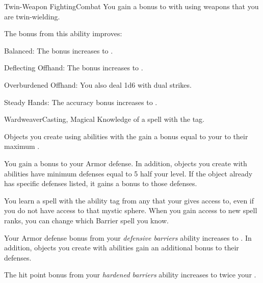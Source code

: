 \begin{feat}{Twin-Weapon Fighting}{Combat}
     You gain a  bonus to  with  using weapons that you are twin-wielding.

     The bonus from this ability improves:
    \begin{raggeditemize}
      \item Balanced: The bonus increases to .
      \item Deflecting Offhand: The bonus increases to .
      \item Overburdened Offhand: You also deal 1d6  with dual strikes.
      \item Steady Hands: The accuracy bonus increases to .
    \end{raggeditemize}
  \end{feat}

  \begin{magicalfeat}{Wardweaver}{Casting, Magical}
    \featpre Knowledge of a spell with the  tag.

     Objects you create using abilities with the   gain a bonus equal to your  to their maximum .

     You gain a  bonus to your Armor defense.
    In addition, objects you create with  abilities have minimum defenses equal to 5 \add half your level.
    If the object already has specific defenses listed, it gains a  bonus to those defenses.

     You learn a spell with the  ability tag from any  that your  gives access to, even if you do not have access to that mystic sphere.
    When you gain access to new spell ranks, you can change which Barrier spell you know.

     Your Armor defense bonus from your \textit{defensive barriers} ability increases to .
    In addition, objects you create with  abilities gain an additional  bonus to their defenses.

     The hit point bonus from your \textit{hardened barriers} ability increases to twice your .
  \end{magicalfeat}

